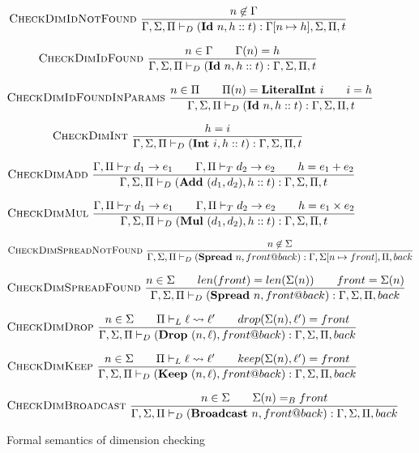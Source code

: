 \documentclass[12pt]{report}
\begin{document}
\begin{figure}
    {\small
    $$\textsc{CheckDimIdNotFound}~\frac{n \not\in \Gamma}{\Gamma, \Sigma, \Pi \vdash_D (\textbf{Id}~n, h :: t) : \Gamma[n \mapsto h], \Sigma, \Pi, t}$$

    $$\textsc{CheckDimIdFound}~\frac{n \in \Gamma \qquad \Gamma(n) = h}{\Gamma, \Sigma, \Pi \vdash_D (\textbf{Id}~n, h :: t) : \Gamma, \Sigma, \Pi, t}$$

    $$\textsc{CheckDimIdFoundInParams}~\frac{n \in \Pi \qquad \Pi(n) = \textbf{LiteralInt}~i \qquad i = h}{\Gamma, \Sigma, \Pi \vdash_D (\textbf{Id}~n, h :: t) : \Gamma, \Sigma, \Pi, t}$$

    $$\textsc{CheckDimInt}~\frac{h = i}{\Gamma, \Sigma, \Pi \vdash_D (\textbf{Int}~i, h :: t) : \Gamma, \Sigma, \Pi, t}$$

    $$\textsc{CheckDimAdd}~\frac{\Gamma, \Pi \vdash_T d_1 \rightarrow e_1 \qquad \Gamma, \Pi \vdash_T d_2 \rightarrow e_2 \qquad h = e_1 + e_2}{\Gamma, \Sigma, \Pi \vdash_D (\textbf{Add}~(d_1, d_2), h :: t) : \Gamma, \Sigma, \Pi, t}$$

    $$\textsc{CheckDimMul}~\frac{\Gamma, \Pi \vdash_T d_1 \rightarrow e_1 \qquad \Gamma, \Pi \vdash_T d_2 \rightarrow e_2 \qquad h = e_1 \times e_2}{\Gamma, \Sigma, \Pi \vdash_D (\textbf{Mul}~(d_1, d_2), h :: t) : \Gamma, \Sigma, \Pi, t}$$

    $$\textsc{CheckDimSpreadNotFound}~\frac{n \not\in \Sigma}{\Gamma, \Sigma, \Pi \vdash_D (\textbf{Spread}~n, front @ back) : \Gamma, \Sigma[n \mapsto front], \Pi, back}$$

    $$\textsc{CheckDimSpreadFound}~\frac{n \in \Sigma \qquad len(front) = len(\Sigma(n)) \qquad front = \Sigma(n)}{\Gamma, \Sigma, \Pi \vdash_D (\textbf{Spread}~n, front @ back) : \Gamma, \Sigma, \Pi, back}$$

    $$\textsc{CheckDimDrop}~\frac{n \in \Sigma \qquad \Pi \vdash_L \ell \rightsquigarrow \ell' \qquad drop(\Sigma(n), \ell') = front}{\Gamma, \Sigma, \Pi \vdash_D (\textbf{Drop}~(n, \ell), front @ back) : \Gamma, \Sigma, \Pi, back}$$

    $$\textsc{CheckDimKeep}~\frac{n \in \Sigma \qquad \Pi \vdash_L \ell \rightsquigarrow \ell' \qquad keep(\Sigma(n), \ell') = front}{\Gamma, \Sigma, \Pi \vdash_D (\textbf{Keep}~(n, \ell), front @ back) : \Gamma, \Sigma, \Pi, back}$$

    $$\textsc{CheckDimBroadcast}~\frac{n \in \Sigma \qquad \Sigma(n) =_B front}{\Gamma, \Sigma, \Pi \vdash_D (\textbf{Broadcast}~n, front @ back) : \Gamma, \Sigma, \Pi, back}$$
    }
    \caption{Formal semantics of dimension checking}
    \label{semantics:dim}
\end{figure}
\end{document}
